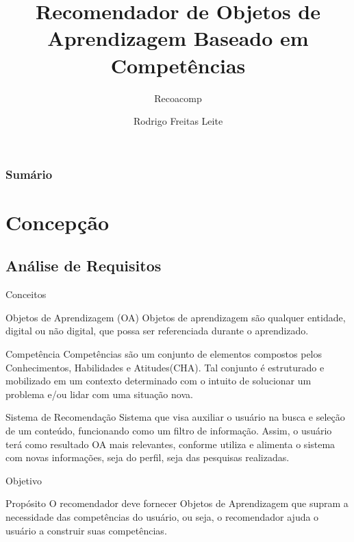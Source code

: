 \documentclass[xcolor=dvipsnames]{beamer}
\title{Recomendador de Objetos de Aprendizagem  Baseado em Competências}
\subtitle{Recoacomp}
\author{Rodrigo Freitas Leite}
\institute{UFRGS-NUTED}
\newcommand{\summario}
{
	\begin{frame}
		\frametitle{Sumário}
		\tableofcontents
	\end{frame}	
}
\begin{document}
\begin{frame}
	\titlepage
\end{frame}


\summario{}

\section{Concepção}
	\subsection{Análise de Requisitos}   
	  \begin{frame}{Conceitos}

	     \begin{block}{Objetos de Aprendizagem (OA)}
Objetos de aprendizagem são qualquer entidade, digital ou não digital, que possa ser referenciada durante o aprendizado.
	  	 \end{block}

 	     \begin{block}{Competência}
Competências são um conjunto de elementos compostos pelos Conhecimentos, Habilidades e Atitudes(CHA). Tal conjunto é estruturado e mobilizado em um contexto determinado com o intuito de solucionar um problema e/ou lidar com uma situação nova.
		 \end{block}

		 \begin{block}{Sistema de Recomendação}
Sistema que visa auxiliar o usuário na busca e seleção de um conteúdo, funcionando como um filtro de informação. Assim, o usuário terá como resultado OA mais relevantes, conforme utiliza e alimenta o sistema com novas informações, seja do perfil, seja das pesquisas realizadas.
		\end{block}	
	
	 \end{frame}

\begin{frame}{Objetivo}

	\begin{block}{Propósito}
O recomendador deve fornecer Objetos de Aprendizagem que supram a necessidade das competências do usuário, ou seja, o recomendador ajuda o usuário a construir suas competências.
	\end{block}

\end{frame}
\end{document}
